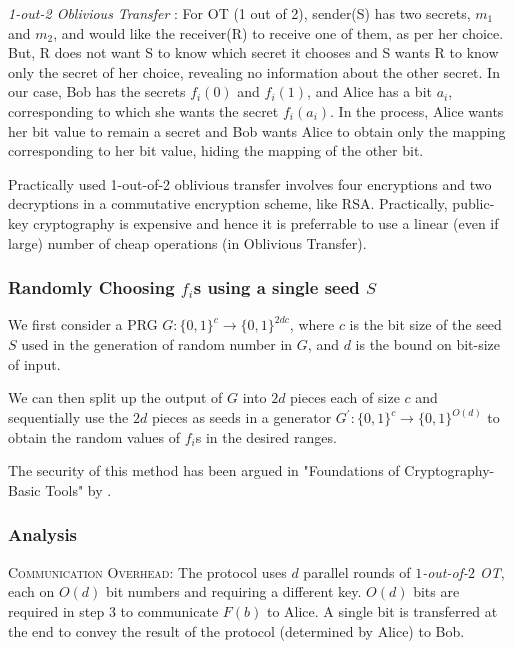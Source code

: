 \documentclass[11pt, letterpaper, romanappendices, onecolumn]{article}
\theoremstyle{plain}\newtheorem{thm}{Theorem}[section]
\theoremstyle{definition}
\theoremstyle{remark}
\begin{document}
\par \textit{1-out-2 Oblivious Transfer} : For OT (1 out of 2), sender(S) has two secrets, $m_1$ and $m_2$, and would like the receiver(R) to receive one of them, as per her choice. But, R does not want S to know which secret it chooses and S wants R to know only the secret of her choice, revealing no information about the other secret. In our case, Bob has the secrets $f_i(0)$ and $f_i(1)$, and Alice has a bit $a_i$, corresponding to which she wants the secret $f_i(a_i)$. In the process, Alice wants her bit value to remain a secret and Bob wants Alice to obtain only the mapping corresponding to her bit value, hiding the mapping of the other bit.
\par Practically used 1-out-of-2 oblivious transfer involves four encryptions and two decryptions in a commutative encryption scheme, like RSA. Practically, public-key cryptography is expensive and hence it is preferrable to use a linear (even if large) number of cheap operations (in Oblivious Transfer). 

\subsubsection{Randomly Choosing $f_i$s using a single seed $S$} \label{sec:prg}
\par We first consider a PRG $G: \lbrace 0,1 \rbrace^c \longrightarrow \lbrace 0,1 \rbrace^{2dc}$, where $c$ is the bit size of the seed $S$ used in the generation of random number in $G$, and $d$ is the bound on bit-size of input.

\par We can then split up the output of $G$ into $2d$ pieces each of size $c$ and sequentially use the $2d$ pieces as seeds in a generator $G^\prime : \lbrace 0,1 \rbrace^c \longrightarrow \lbrace 0,1 \rbrace^{O(d)}$ to obtain the random values of $f_i$s in the desired ranges.

The security of this method has been argued in "Foundations of Cryptography-Basic Tools" by \citet{Goldreich01book}.

\subsubsection{Analysis}
\textsc{Communication Overhead:} The protocol uses $d$ parallel rounds of \textit{$1$-out-of-$2$ OT}, each on $O(d)$ bit numbers and requiring a different key. $O(d)$ bits are required in step 3 to communicate $F(b)$ to Alice. A single bit is transferred at the end to convey the result of the protocol (determined by Alice) to Bob. 
\end{document}
